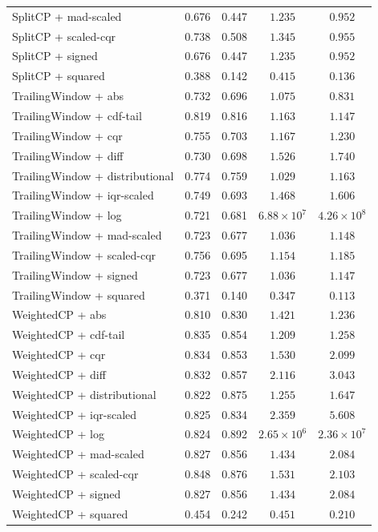 \begin{longtable}{lcccc}
	SplitCP + mad-scaled & 0.676 & 0.447 & $1.235$ & $0.952$ \\
	SplitCP + scaled-cqr & 0.738 & 0.508 & $1.345$ & $0.955$ \\
	SplitCP + signed & 0.676 & 0.447 & $1.235$ & $0.952$ \\
	SplitCP + squared & 0.388 & 0.142 & $0.415$ & $0.136$ \\
	TrailingWindow + abs & 0.732 & 0.696 & $1.075$ & $0.831$ \\
	TrailingWindow + cdf-tail & 0.819 & 0.816 & $1.163$ & $1.147$ \\
	TrailingWindow + cqr & 0.755 & 0.703 & $1.167$ & $1.230$ \\
	TrailingWindow + diff & 0.730 & 0.698 & $1.526$ & $1.740$ \\
	TrailingWindow + distributional & 0.774 & 0.759 & $1.029$ & $1.163$ \\
	TrailingWindow + iqr-scaled & 0.749 & 0.693 & $1.468$ & $1.606$ \\
	TrailingWindow + log & 0.721 & 0.681 & $6.88 \times 10^{7}$ & $4.26 \times 10^{8}$ \\
	TrailingWindow + mad-scaled & 0.723 & 0.677 & $1.036$ & $1.148$ \\
	TrailingWindow + scaled-cqr & 0.756 & 0.695 & $1.154$ & $1.185$ \\
	TrailingWindow + signed & 0.723 & 0.677 & $1.036$ & $1.147$ \\
	TrailingWindow + squared & 0.371 & 0.140 & $0.347$ & $0.113$ \\
	WeightedCP + abs & 0.810 & 0.830 & $1.421$ & $1.236$ \\
	WeightedCP + cdf-tail & 0.835 & 0.854 & $1.209$ & $1.258$ \\
	WeightedCP + cqr & 0.834 & 0.853 & $1.530$ & $2.099$ \\
	WeightedCP + diff & 0.832 & 0.857 & $2.116$ & $3.043$ \\
	WeightedCP + distributional & 0.822 & 0.875 & $1.255$ & $1.647$ \\
	WeightedCP + iqr-scaled & 0.825 & 0.834 & $2.359$ & $5.608$ \\
	WeightedCP + log & 0.824 & 0.892 & $2.65 \times 10^{6}$ & $2.36 \times 10^{7}$ \\
	WeightedCP + mad-scaled & 0.827 & 0.856 & $1.434$ & $2.084$ \\
	WeightedCP + scaled-cqr & 0.848 & 0.876 & $1.531$ & $2.103$ \\
	WeightedCP + signed & 0.827 & 0.856 & $1.434$ & $2.084$ \\
	WeightedCP + squared & 0.454 & 0.242 & $0.451$ & $0.210$ \\
\end{longtable}

